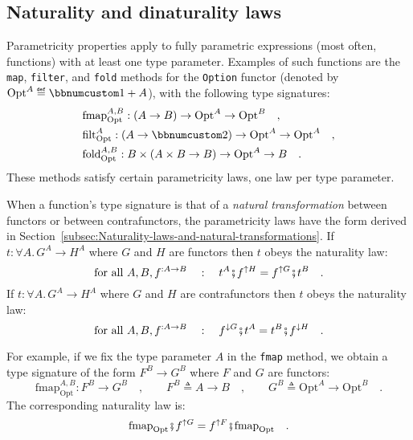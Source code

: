 \subsection{Naturality and dinaturality laws\label{sec:Naturality-laws-for-fully-parametric-functions} }

Parametricity properties apply to fully parametric expressions (most
often, functions) with at least one type parameter. Examples of such
functions are the \lstinline!map!, \lstinline!filter!, and \lstinline!fold!
methods for the \lstinline!Option! functor (denoted by $\text{Opt}^{A}\triangleq\bbnum 1+A$),
with the following type signatures:
\begin{align*}
 & \text{fmap}_{\text{Opt}}^{A,B}:\left(A\rightarrow B\right)\rightarrow\text{Opt}^{A}\rightarrow\text{Opt}^{B}\quad,\\
 & \text{filt}_{\text{Opt}}^{A}:\left(A\rightarrow\bbnum 2\right)\rightarrow\text{Opt}^{A}\rightarrow\text{Opt}^{A}\quad,\\
 & \text{fold}_{\text{Opt}}^{A,B}:B\times\left(A\times B\rightarrow B\right)\rightarrow\text{Opt}^{A}\rightarrow B\quad.
\end{align*}
These methods satisfy certain parametricity laws, one law per type
parameter.

When a function\textsf{'}s type signature is that of a \emph{natural transformation}
between functors or between contrafunctors, the parametricity laws
have the form derived in Section~\ref{subsec:Naturality-laws-and-natural-transformations}.
If $t:\forall A.\,G^{A}\rightarrow H^{A}$ where $G$ and $H$ are
functors then $t$ obeys the naturality law:
\begin{equation}
\text{for all }A,B,f^{:A\rightarrow B}\quad:\quad t^{A}\bef f^{\uparrow H}=f^{\uparrow G}\bef t^{B}\quad.\label{eq:naturality-law-for-functors}
\end{equation}
If $t:\forall A.\,G^{A}\rightarrow H^{A}$ where $G$ and $H$ are
contrafunctors then $t$ obeys the naturality law:
\begin{equation}
\text{for all }A,B,f^{:A\rightarrow B}\quad:\quad f^{\downarrow G}\bef t^{A}=t^{B}\bef f^{\downarrow H}\quad.\label{eq:naturality-law-for-contrafunctors}
\end{equation}

For example, if we fix the type parameter $A$ in the \lstinline!fmap!
method, we obtain a type signature of the form $F^{B}\rightarrow G^{B}$
where $F$ and $G$ are functors:
\[
\text{fmap}_{\text{Opt}}^{A,B}:F^{B}\rightarrow G^{B}\quad,\quad\quad F^{B}\triangleq A\rightarrow B\quad,\quad\quad G^{B}\triangleq\text{Opt}^{A}\rightarrow\text{Opt}^{B}\quad.
\]
The corresponding naturality law is:
\[
\text{fmap}_{\text{Opt}}\bef f^{\uparrow G}=f^{\uparrow F}\bef\text{fmap}_{\text{Opt}}\quad.
\]

